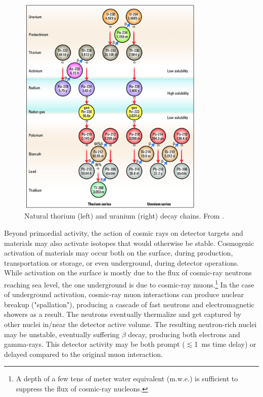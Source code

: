 \begin{figure}[t!b!]
\begin{center}
\includegraphics[width=0.8\textwidth]{img/Natural-thorium-and-uranium-decay-chains.png} 
\caption{Natural thorium (left) and uranium (right) decay chains. From \cite{decaychain}.} \label{fig:decaychain}
\end{center}
\end{figure}

Beyond primordial activity, the action of cosmic rays on detector targets and materials may also activate isotopes that would otherwise be stable. Cosmogenic activation of materials may occur both on the surface, during production, transportation or storage, or even underground, during detector operations. While activation on the surface is mostly due to the flux of cosmic-ray neutrons reaching sea level, the one underground is due to cosmic-ray muons.\footnote{A depth of a few tens of meter water equivalent (m.w.e.) is sufficient to suppress the flux of cosmic-ray nucleons.} In the case of underground activation, cosmic-ray muon interactions can produce nuclear breakup ("spallation"), producing a cascade of fast neutrons and electromagnetic showers as a result. The neutrons eventually thermalize and get captured by other nuclei in/near the detector active volume. The resulting neutron-rich nuclei may be unstable, eventually suffering $\beta$ decay, producing both electrons and gamma-rays. This detector activity may be both prompt ($\lesssim$1~ms time delay) or delayed compared to the original muon interaction.

